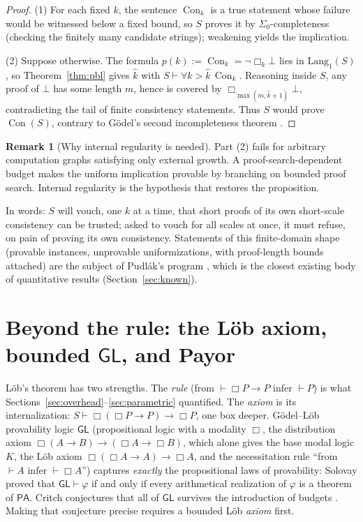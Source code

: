 \documentclass[11pt]{amsart}
\theoremstyle{plain}
\theoremstyle{definition}
\newtheorem{remark}[theorem]{Remark}
\newcommand{\PA}{\mathsf{PA}}
\newcommand{\GL}{\mathsf{GL}}
\newcommand{\Lang}{\mathrm{Lang}}
\newcommand{\Con}{\operatorname{Con}}
\begin{document}
\begin{proof}
(1) For each fixed $k$, the sentence $\Con_k$ is a true statement whose failure would be witnessed below a fixed bound, so $S$ proves it by $\Sigma_0$-completeness (checking the finitely many candidate strings); weakening yields the implication.

(2) Suppose otherwise. The formula $p(k):=\Con_k=\neg\Box_k\bot$ lies in $\Lang_1(S)$, so Theorem~\ref{thm:pbl} gives $\hat{k}$ with $S\vdash\forall k>\hat{k}\,\Con_k$. Reasoning inside $S$, any proof of $\bot$ has some length $m$, hence is covered by $\Box_{\max(m,\hat{k}+1)}\bot$, contradicting the tail of finite consistency statements. Thus $S$ would prove $\Con(S)$, contrary to G\"odel's second incompleteness theorem \cite{godel1931}.
\end{proof}

\begin{remark}[Why internal regularity is needed]
Part (2) fails for arbitrary computation graphs satisfying only external growth. A proof-search-dependent budget makes the uniform implication provable by branching on bounded proof search. Internal regularity is the hypothesis that restores the proposition.
\end{remark}

In words: $S$ will vouch, one $k$ at a time, that short proofs of its own short-scale consistency can be trusted; asked to vouch for all scales at once, it must refuse, on pain of proving its own consistency. Statements of this finite-domain shape (provable instances, unprovable uniformizations, with proof-length bounds attached) are the subject of Pudl\'ak's program \cite{pudlak2017}, which is the closest existing body of quantitative results (Section~\ref{sec:known}).

\section{Beyond the rule: the L\"ob axiom, bounded \texorpdfstring{$\GL$}{GL}, and Payor}
\label{sec:beyond}

L\"ob's theorem has two strengths. The \emph{rule} (from $\vdash \Box P \to P$ infer $\vdash P$) is what Sections~\ref{sec:overhead}--\ref{sec:parametric} quantified. The \emph{axiom} is its internalization: $S \vdash \Box(\Box P \to P) \to \Box P$, one box deeper. G\"odel--L\"ob provability logic $\GL$ (propositional logic with a modality $\Box$, the distribution axiom $\Box(A \to B) \to (\Box A \to \Box B)$, which alone gives the base modal logic $K$, the L\"ob axiom $\Box(\Box A \to A) \to \Box A$, and the necessitation rule ``from $\vdash A$ infer $\vdash \Box A$'') captures \emph{exactly} the propositional laws of provability: Solovay \cite{solovay1976} proved that $\GL \vdash \varphi$ if and only if every arithmetical realization of $\varphi$ is a theorem of $\PA$. Critch conjectures that all of $\GL$ survives the introduction of budgets \cite{critch2016}. Making that conjecture precise requires a bounded L\"ob \emph{axiom} first.
\end{document}
